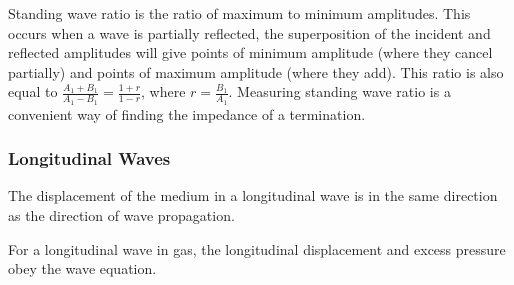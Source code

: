 \documentclass[a4paper]{article}
\begin{document}
\begin{defi}
Standing wave ratio is the ratio of maximum to minimum amplitudes. This occurs when a wave is partially reflected, the superposition of the incident and reflected amplitudes will give points of minimum amplitude (where they cancel partially) and points of maximum amplitude (where they add). This ratio is also equal to $\frac{A_1+B_1}{A_1-B_1}=\frac{1+r}{1-r}$, where $r=\frac{B_1}{A_1}$. Measuring standing wave ratio is a convenient way of finding the impedance of a termination.
\end{defi}
\subsubsection*{Longitudinal Waves}
\begin{defi}
The displacement of the medium in a longitudinal wave is in the same direction as the direction of wave propagation.
\end{defi}
\begin{thm}
For a longitudinal wave in gas, the longitudinal displacement and excess pressure obey the wave equation.
\end{thm}
\end{document}
